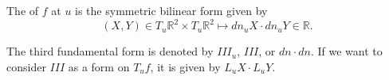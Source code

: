 The  of $f$ at $u$ is the symmetric bilinear form given by
$$(X, Y) \in T_u \mathbb{R}^2 \times T_u \mathbb{R}^2 \mapsto dn_u X \cdot dn_u Y \in \mathbb{R}.$$

The third fundamental form is denoted by $III_u$, $III$, or $dn \cdot dn$. If we want to consider $III$ as a form on $T_u f$, it is given by $L_u X \cdot L_u Y$.
